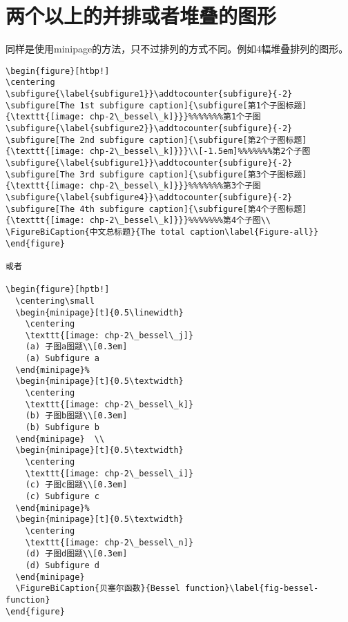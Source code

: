 \section{两个以上的并排或者堆叠的图形}\label{section2-3}
同样是使用minipage的方法，只不过排列的方式不同。例如4幅堆叠排列的图形。
\begin{verbatim}
\begin{figure}[htbp!]
\centering
\subfigure{\label{subfigure1}}\addtocounter{subfigure}{-2}
\subfigure[The 1st subfigure caption]{\subfigure[第1个子图标题]
{\texttt{[image: chp-2\_bessel\_k]}}}%%%%%%%第1个子图
\subfigure{\label{subfigure2}}\addtocounter{subfigure}{-2}
\subfigure[The 2nd subfigure caption]{\subfigure[第2个子图标题]
{\texttt{[image: chp-2\_bessel\_k]}}}\\[-1.5em]%%%%%%%第2个子图
\subfigure{\label{subfigure1}}\addtocounter{subfigure}{-2}
\subfigure[The 3rd subfigure caption]{\subfigure[第3个子图标题]
{\texttt{[image: chp-2\_bessel\_k]}}}%%%%%%%第3个子图
\subfigure{\label{subfigure4}}\addtocounter{subfigure}{-2}
\subfigure[The 4th subfigure caption]{\subfigure[第4个子图标题]
{\texttt{[image: chp-2\_bessel\_k]}}}%%%%%%%第4个子图\\
\FigureBiCaption{中文总标题}{The total caption\label{Figure-all}}
\end{figure}

或者

\begin{figure}[hptb!]
  \centering\small
  \begin{minipage}[t]{0.5\linewidth}
    \centering
    \texttt{[image: chp-2\_bessel\_j]}
    (a) 子图a图题\\[0.3em]
    (a) Subfigure a
  \end{minipage}%
  \begin{minipage}[t]{0.5\textwidth}
    \centering
    \texttt{[image: chp-2\_bessel\_k]}
    (b) 子图b图题\\[0.3em]
    (b) Subfigure b
  \end{minipage}  \\
  \begin{minipage}[t]{0.5\textwidth}
    \centering
    \texttt{[image: chp-2\_bessel\_i]}
    (c) 子图c图题\\[0.3em]
    (c) Subfigure c
  \end{minipage}%
  \begin{minipage}[t]{0.5\textwidth}
    \centering
    \texttt{[image: chp-2\_bessel\_n]}
    (d) 子图d图题\\[0.3em]
    (d) Subfigure d
  \end{minipage}
  \FigureBiCaption{贝塞尔函数}{Bessel function}\label{fig-bessel-function}
\end{figure}
\end{verbatim}
